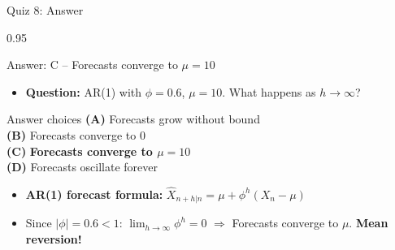 \documentclass[9pt, aspectratio=169, t]{beamer}
\begin{document}
\begin{frame}{Quiz 8: Answer}
    \begin{cminipage}{0.95\textwidth}
    \begin{exampleblock}{Answer: C -- Forecasts converge to $\mu = 10$}
        \begin{itemize}\setlength{\itemsep}{0pt}
            \item \textbf{Question:} AR(1) with $\phi = 0.6$, $\mu = 10$. What happens as $h \to \infty$?
        \end{itemize}

        \vspace{0.3cm}

    \begin{block}{Answer choices}
        \textcolor{MainBlue}{\textbf{(A)}} Forecasts grow without bound \incorrect\\[3pt]
        \textcolor{MainBlue}{\textbf{(B)}} Forecasts converge to 0 \incorrect\\[3pt]
        \textcolor{MainBlue}{\textbf{(C)}} \textbf{\textcolor{Forest}{Forecasts converge to $\mu = 10$}} \correct\\[3pt]
        \textcolor{MainBlue}{\textbf{(D)}} Forecasts oscillate forever \incorrect
    \end{block}

        \vspace{0.3cm}

        \begin{itemize}
            \item \textbf{AR(1) forecast formula:} $\hat{X}_{n+h|n} = \mu + \phi^h(X_n - \mu)$
            \item Since $|\phi| = 0.6 < 1$: $\lim_{h \to \infty} \phi^h = 0$ $\Rightarrow$ Forecasts converge to $\mu$. \textbf{Mean reversion!}
        \end{itemize}
    \end{exampleblock}

    \end{cminipage}
\end{frame}
\end{document}
